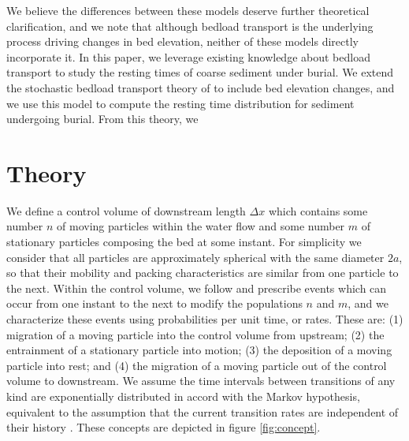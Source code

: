\documentclass[draft]{agujournal2018}
\begin{document}
We believe the differences between these models deserve further theoretical clarification, and we note that although bedload transport is the underlying process driving changes in bed elevation, neither of these models directly incorporate it.
In this paper, we leverage existing knowledge about bedload transport to study the resting times of coarse sediment under burial.
We extend the stochastic bedload transport theory of \citet{Ancey2008} to include bed elevation changes, and we use this model to compute the resting time distribution for sediment undergoing burial.
From this theory, we 



\section{Theory}

We define a control volume of downstream length $\Delta x$ which contains some number $n$ of moving particles within the water flow and some number $m$ of stationary particles composing the bed at some instant.
For simplicity we consider that all particles are approximately spherical with the same diameter $2a$, so that their mobility and packing characteristics are similar from one particle to the next.
Within the control volume, we follow \citet{Ancey2008} and prescribe events which can occur from one instant to the next to modify the populations $n$ and $m$, and we characterize these events using probabilities per unit time, or rates.
These are: (1) migration of a moving particle into the control volume from upstream; (2) the entrainment of a stationary particle into motion; (3) the deposition of a moving particle into rest; and (4) the migration of a moving particle out of the control volume to downstream.
We assume the time intervals between transitions of any kind are exponentially distributed in accord with the Markov hypothesis, equivalent to the assumption that the current transition rates are independent of their history \citep[e.g.][]{Cox1965}.
These concepts are depicted in figure \ref{fig:concept}. 
\end{document}
